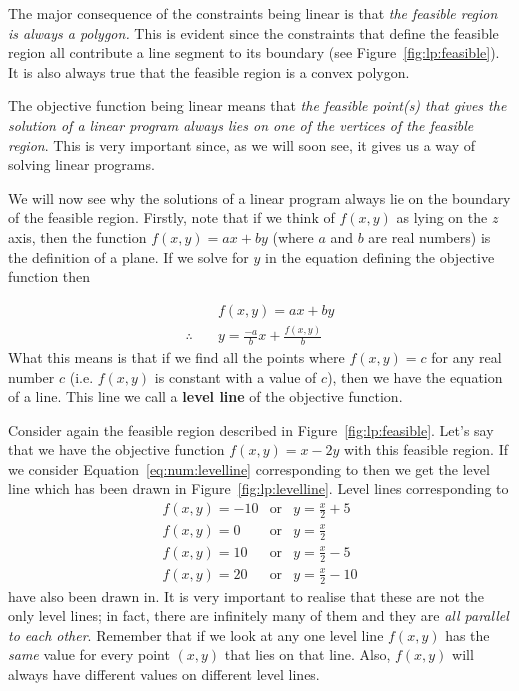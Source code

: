 The major consequence of the constraints being linear is that \textit{the feasible region is always a polygon.} This is evident since the constraints that define the feasible region all contribute a line segment to its boundary (see Figure~\ref{fig:lp:feasible}). It is also always true that the feasible region is a convex polygon.

The objective function being linear means that \textit{the feasible point(s) that gives the solution of a linear program always lies on one of the vertices of the feasible region}. This is very important since, as we will soon see, it gives us a way of solving linear programs. 

We will now see why the solutions of a linear program always lie on the boundary of the feasible region. Firstly, note that if we think of $f(x,y)$ as lying on the $z$ axis, then the function $f(x,y)=ax+by$ (where $a$ and $b$ are real numbers) is the definition of a plane. If we solve for $y$ in the equation defining the objective function then

\begin{align}
\nonumber & \quad f(x,y)=ax+by\\
\therefore & \quad y=\frac{-a}{b}x+\frac{f(x,y)}{b}
\end{align}
\label{eq:num:levelline}
What this means is that if we find all the points where $f(x,y)=c$ for any real number $c$ (i.e. $f(x,y)$ is constant with a value of $c$), then we have the equation of a line. This line we call a \textbf{level line} of the objective function.

Consider again the feasible region described in Figure~\ref{fig:lp:feasible}. Let's say that we have the objective function $f(x,y)=x-2y$ with this feasible region. If we consider Equation~\ref{eq:num:levelline} corresponding to
then we get the level line
which has been drawn in Figure~\ref{fig:lp:levelline}. Level lines corresponding to
\begin{eqnarray*}
f(x,y)=-10 &\text{or}&y=\frac{x}{2}+5\\
f(x,y)=0 &\text{or}& y=\frac{x}{2}\\
f(x,y)=10 &\text{or}& y=\frac{x}{2}-5\\
f(x,y)=20 &\text{or}& y=\frac{x}{2}-10
\end{eqnarray*}
have also been drawn in. It is very important to realise that these are not the only level lines; in fact, there are infinitely many of them and they are \textit{all parallel to each other}. Remember that if we look at any one level line $f(x,y)$ has the \textit{same} value for every point $(x,y)$ that lies on that line. Also, $f(x,y)$ will always have different values on different level lines.

